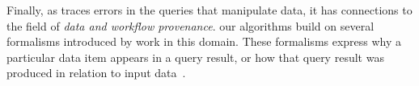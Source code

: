 Finally, as \sys traces errors in the queries that manipulate data, it
has connections to the field of \emph{data and workflow provenance}.
our algorithms build on several formalisms introduced by work in this
domain. These formalisms express why a particular data item appears in
a query result, or how that query result was produced in relation to
input data~\cite{BunemanKT01,GKT07-semirings, CheneyCT09, CuiWW00
}.
\fi

% 
% 
% 
% 
% 
% 
% 
% 
% 
% 
% 
% 
% 
% 
% 
